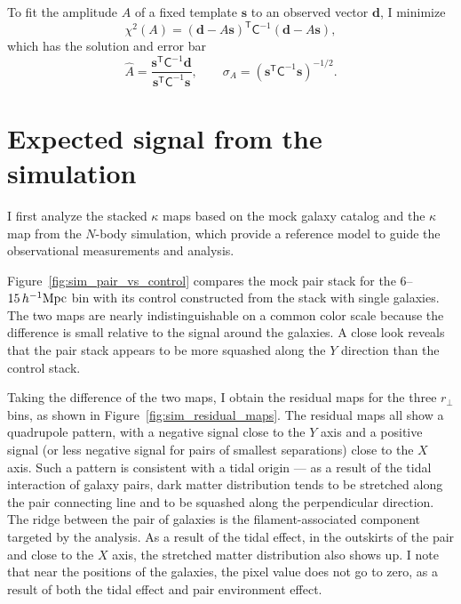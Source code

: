 \documentclass[11pt,letterpaper]{article}
\newcommand{\hinvMpc}{h^{-1}{\rm Mpc}}
\begin{document}
To fit the amplitude $A$ of a fixed template $\mathbf{s}$ to an observed
vector $\mathbf{d}$, I minimize
\begin{equation}
  \chi^{2}(A) =(\mathbf{d}-A\mathbf{s})^{\mathsf T}\mathsf{C}^{-1}
                 (\mathbf{d}-A\mathbf{s}), 
\end{equation}
which has the solution and error bar
\begin{equation}
  \hat A =\frac{\mathbf{s}^{\mathsf T}\mathsf{C}^{-1}\mathbf{d}}
                 {\mathbf{s}^{\mathsf T}\mathsf{C}^{-1}\mathbf{s}}, \qquad
  \sigma_{A}=\left(\mathbf{s}^{\mathsf T}\mathsf{C}^{-1}\mathbf{s}\right)^{-1/2}.
  \label{eq:amplitude}
\end{equation}

\section{Expected signal from the simulation}
\label{sec:sim_expect}

I first analyze the stacked $\kappa$ maps based on the mock galaxy catalog and the $\kappa$ map from the $N$-body simulation, which provide a reference model to guide the observational measurements and analysis. 

Figure~\ref{fig:sim_pair_vs_control} compares the mock pair stack for the
$6$--$15\,\hinvMpc$ bin with its control constructed from the stack with single galaxies. The two maps are nearly indistinguishable on a common color scale because the difference is small relative to the signal around the galaxies. A close look reveals that the pair stack appears to be more squashed along the $Y$ direction than the control stack.

Taking the difference of the two maps, I obtain the residual maps for the three $r_{\perp}$ bins, as shown in Figure~\ref{fig:sim_residual_maps}. 
The residual maps all show a quadrupole pattern, with a negative signal close to the $Y$ axis and a positive signal (or less negative signal for pairs of smallest separations) close to the $X$ axis. Such a pattern is consistent with a tidal origin --- as a result of the tidal interaction of galaxy pairs, dark matter distribution tends to be stretched along the pair connecting line and to be squashed along the perpendicular direction. The ridge between the pair of galaxies is the filament-associated component targeted by the analysis. As a result of the tidal effect, in the outskirts of the pair and close to the $X$ axis, the stretched matter distribution also shows up. I note that near the positions of the galaxies, the pixel value does not go to zero, as a result of both the tidal effect and pair environment effect.
\end{document}
